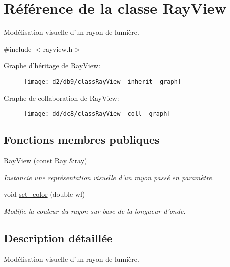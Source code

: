 \hypertarget{classRayView}{\section{Référence de la classe Ray\+View}
\label{classRayView}
}


Modélisation visuelle d’un rayon de lumière.  




{\ttfamily \#include $<$rayview.\+h$>$}



Graphe d'héritage de Ray\+View\+:\nopagebreak
\begin{figure}[H]
\begin{center}
\leavevmode
\texttt{[image: d2/db9/classRayView\_\_inherit\_\_graph]}
\end{center}
\end{figure}


Graphe de collaboration de Ray\+View\+:\nopagebreak
\begin{figure}[H]
\begin{center}
\leavevmode
\texttt{[image: dd/dc8/classRayView\_\_coll\_\_graph]}
\end{center}
\end{figure}
\subsection*{Fonctions membres publiques}
\begin{DoxyCompactItemize}
\item 
\hyperlink{classRayView_a8a8fc6d9d3751260edc9e07221706fdb}{Ray\+View} (const \hyperlink{classRay}{Ray} \&ray)
\begin{DoxyCompactList}\small\item\em Instancie une représentation visuelle d’un rayon passé en paramètre. \end{DoxyCompactList}\item 
void \hyperlink{classRayView_a7bb1f2437aae2fbe7fba8833c58eda73}{set\+\_\+color} (double wl)
\begin{DoxyCompactList}\small\item\em Modifie la couleur du rayon sur base de la longueur d'onde. \end{DoxyCompactList}\end{DoxyCompactItemize}


\subsection{Description détaillée}
Modélisation visuelle d’un rayon de lumière. 

